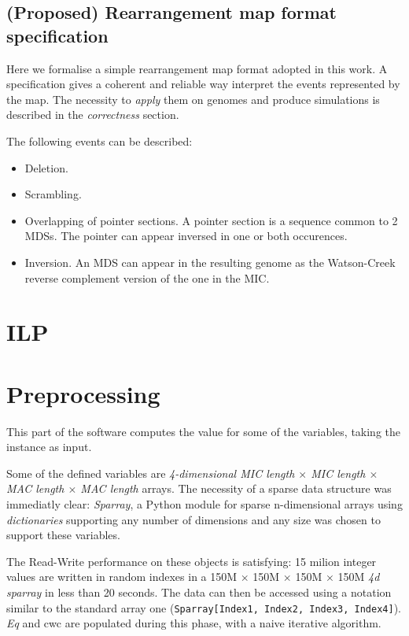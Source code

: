 \subsection{(Proposed) Rearrangement map format specification}
Here we formalise a simple rearrangement map format adopted in this work. A specification gives a coherent and reliable way interpret the events represented by the map. The necessity to \textit{apply} them on genomes and produce simulations is described in the \textit{correctness} section.

The following events can be described:

\begin{itemize}
	\item Deletion.
	\item Scrambling.
	\item Overlapping of pointer sections. A pointer section is a sequence common to 2 MDSs. The pointer can appear inversed in one or both occurences.
	\item Inversion. An MDS can appear in the resulting genome as the Watson-Creek reverse complement version of the one in the MIC.
\end{itemize}

\section{ILP}


\section{Preprocessing}
This part of the software computes the value for some of the variables, taking the instance as input.

Some of the defined variables are \textit{4-dimensional MIC length $\times$ MIC length $\times$ MAC length $\times$ MAC length} arrays. The necessity of a sparse data structure was immediatly clear: \textit{Sparray}, a Python module \cite{sparray} for sparse n-dimensional arrays using \textit{dictionaries} supporting any number of dimensions and any size was chosen to support these variables.

The Read-Write performance on these objects is satisfying: 15 milion integer values are written in random indexes in a 150M $\times$ 150M $\times$ 150M $\times$ 150M \textit{4d sparray} in less than 20 seconds. The data can then be accessed using a notation similar to the standard array one (\texttt{Sparray[Index1, Index2, Index3, Index4]}). \textit{Eq} and {cwc} are populated during this phase, with a naive iterative algorithm.

